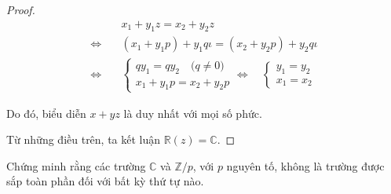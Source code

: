 \documentclass[class=linearalgebra,crop=false]{standalone}
\begin{document}
\begin{proof}
    \begin{align*}
        &x_{1} + y_{1}z = x_{2} + y_{2}z \\
        \Leftrightarrow\quad&(x_{1} + y_{1}p) + y_{1}q\iota = (x_{2} + y_{2}p) + y_{2}q\iota \\
        \Leftrightarrow\quad&
        \begin{cases}
            qy_{1} = qy_{2}\quad\text{($q\ne 0$)} \\
            x_{1} + y_{1}p = x_{2} + y_{2}p
        \end{cases}
        \Leftrightarrow\quad
        \begin{cases}
            y_{1} = y_{2} \\
            x_{1} = x_{2}
        \end{cases}
    \end{align*}
    \par Do đó, biểu diễn $x + yz$ là duy nhất với mọi số phức.

    \par Từ những điều trên, ta kết luận $\mathbb{R}(z) = \mathbb{C}$.
\end{proof}

\begin{exercise}Chứng minh rằng các trường $\mathbb{C}$ và $\mathbb{Z}/p$, với $p$ nguyên tố, không là trường được sắp toàn phần đối với bất kỳ thứ tự nào.
\end{exercise}
\end{document}
